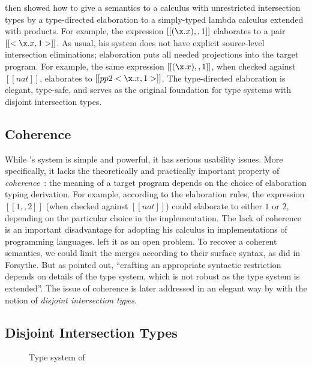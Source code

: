 \citeauthor{dunfield2014elaborating} then showed how to give a semantics to a
calculus with unrestricted intersection types by a type-directed elaboration to
a simply-typed lambda calculus extended with products. For example, the
expression $[[ (\x . x) ,, 1 ]]$ elaborates to a pair $[[ <\x. x , 1> ]]$. As
usual, his system does not have explicit source-level intersection eliminations;
elaboration puts all needed projections into the target program. For example,
the same expression $[[ (\x . x) ,, 1 ]]$, when checked against $[[nat]]$, elaborates to $[[ pp2 <\x. x , 1> ]]$. The
type-directed elaboration is elegant, type-safe, and serves as the original
foundation for type systems with disjoint intersection types.


\subsection{Coherence}

While \citeauthor{dunfield2014elaborating}'s system is simple and powerful, it
has serious usability issues. More specifically, it lacks the theoretically and
practically important property of \textit{coherence}~\citep{Reynolds_1991}: the
meaning of a target program depends on the choice of elaboration typing
derivation. For example, according to the elaboration rules, the expression $[[1
,, 2]]$ (when checked against $[[nat]]$) could elaborate to either $1$ or $2$,
depending on the particular choice in the implementation. The lack of coherence
is an important disadvantage for adopting his calculus in implementations of
programming languages. \citeauthor{dunfield2014elaborating} left it as an open
problem. To recover a coherent semantics, we could limit the merges according to
their surface syntax, as \citeauthor{reynolds1988preliminary} did in Forsythe.
But as \citet{dunfield2014elaborating} pointed out, ``crafting an
appropriate syntactic restriction depends on details of the type system, which
is not robust as the type system is extended''. The issue of coherence is later
addressed in an elegant way by \citet{oliveira2016disjoint} with the notion of
\textit{disjoint intersection types}.


\subsection{Disjoint Intersection Types}

\renewcommand{\rulehl}[1]{#1}


\begin{figure}
  \centering
  \caption{Type system of \oname}
  \label{fig:lambdai}
\end{figure}

